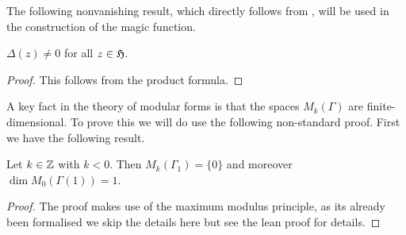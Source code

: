 The following nonvanishing result, which directly follows from , will be used in the construction of the magic function.
\begin{corollary}\label{cor:disc-nonvanishing}\leanok{}
$\Delta(z) \neq 0$ for all $z \in \mathfrak{H}$.
\end{corollary}
\begin{proof}
    \leanok
This follows from the product formula.
\end{proof}


A key fact in the theory of modular forms is that the spaces $M_k(\Gamma)$ are finite-dimensional.
To prove this we will do use the following non-standard proof. First we have the following result.

\begin{theorem}\label{thm:nonpos_wt}\leanok
    Let $k \in \mathbb{Z}$ with $k < 0$. Then $M_k(\Gamma_1) = \{0\}$ and moreover $\dim M_0(\Gamma(1)) = 1$.
\end{theorem}
\begin{proof}
    \leanok
    The proof makes use of the maximum modulus principle, as its already been formalised we skip the details here but see the lean proof for details.
\end{proof}


